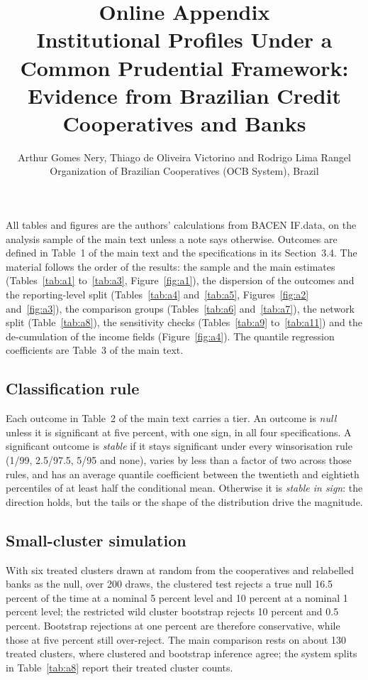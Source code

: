 \documentclass[11pt,a4paper]{article}
\title{Online Appendix\\[0.3em]\large Institutional Profiles Under a Common Prudential
Framework: Evidence from Brazilian Credit Cooperatives and Banks}
\author{Arthur Gomes Nery, Thiago de Oliveira Victorino and
Rodrigo Lima Rangel\\[0.6em]
\small Organization of Brazilian Cooperatives (OCB System), Brazil}
\date{}
\begin{document}
\maketitle

\noindent All tables and figures are the authors' calculations from BACEN IF.data, on
the analysis sample of the main text unless a note says otherwise. Outcomes are defined
in Table~1 of the main text and the specifications in its Section~3.4. The material
follows the order of the results: the sample and the main estimates
(Tables~\ref{tab:a1} to~\ref{tab:a3}, Figure~\ref{fig:a1}), the dispersion of the
outcomes and the reporting-level split (Tables~\ref{tab:a4} and~\ref{tab:a5},
Figures~\ref{fig:a2} and~\ref{fig:a3}), the comparison groups (Tables~\ref{tab:a6}
and~\ref{tab:a7}), the network split (Table~\ref{tab:a8}), the sensitivity checks
(Tables~\ref{tab:a9} to~\ref{tab:a11}) and the de-cumulation of the income fields
(Figure~\ref{fig:a4}). The quantile regression coefficients are Table~3 of the main
text.

\subsection*{Classification rule}

Each outcome in Table~2 of the main text carries a tier. An outcome is \textit{null}
unless it is significant at five percent, with one sign, in all four specifications. A
significant outcome is \textit{stable} if it stays significant under every winsorisation
rule (1/99, 2.5/97.5, 5/95 and none), varies by less than a factor of two across those
rules, and has an average quantile coefficient between the twentieth and eightieth
percentiles of at least half the conditional mean. Otherwise it is \textit{stable in
sign}: the direction holds, but the tails or the shape of the distribution drive the
magnitude.

\subsection*{Small-cluster simulation}

With six treated clusters drawn at random from the cooperatives and relabelled banks as
the null, over 200 draws, the clustered test rejects a true null 16.5 percent of the time
at a nominal 5 percent level and 10 percent at a nominal 1 percent level; the restricted
wild cluster bootstrap rejects 10 percent and 0.5 percent. Bootstrap rejections at one
percent are therefore conservative, while those at five percent still over-reject. The
main comparison rests on about 130 treated clusters, where clustered and bootstrap
inference agree; the system splits in Table~\ref{tab:a8} report their treated cluster
counts.
\end{document}
